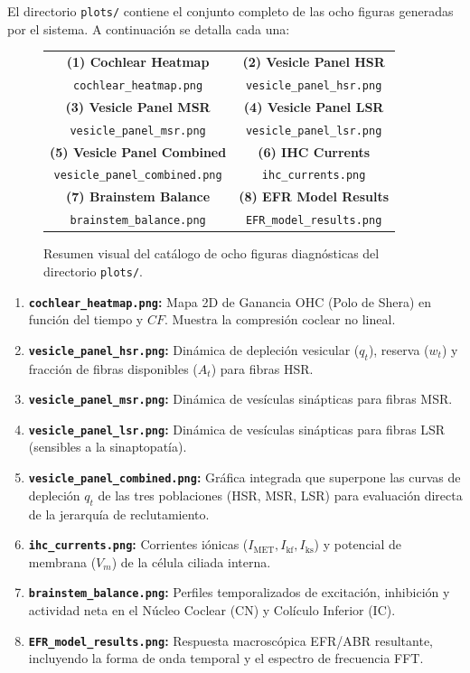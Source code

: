 \documentclass[12pt,a4paper]{article}
\begin{document}
El directorio {\texttt{plots/}} contiene el conjunto completo de las ocho figuras generadas por el sistema. A continuación se detalla cada una:

\begin{figure}[H]
    \centering
    \caption{Resumen visual del catálogo de ocho figuras diagnósticas del directorio \texttt{plots/}.}
    \label{fig:catalogo_plots}
    \begin{tabular}{cc}
        \textbf{(1) Cochlear Heatmap} & \textbf{(2) Vesicle Panel HSR} \\
        \texttt{cochlear\_heatmap.png} & \texttt{vesicle\_panel\_hsr.png} \\[0.5em]
        \textbf{(3) Vesicle Panel MSR} & \textbf{(4) Vesicle Panel LSR} \\
        \texttt{vesicle\_panel\_msr.png} & \texttt{vesicle\_panel\_lsr.png} \\[0.5em]
        \textbf{(5) Vesicle Panel Combined} & \textbf{(6) IHC Currents} \\
        \texttt{vesicle\_panel\_combined.png} & \texttt{ihc\_currents.png} \\[0.5em]
        \textbf{(7) Brainstem Balance} & \textbf{(8) EFR Model Results} \\
        \texttt{brainstem\_balance.png} & \texttt{EFR\_model\_results.png} \\
    \end{tabular}
\end{figure}

\begin{enumerate}
    \item \textbf{\texttt{cochlear\_heatmap.png}:} Mapa 2D de Ganancia OHC (Polo de Shera) en función del tiempo y $CF$. Muestra la compresión coclear no lineal.
    \item \textbf{\texttt{vesicle\_panel\_hsr.png}:} Dinámica de depleción vesicular ($q_t$), reserva ($w_t$) y fracción de fibras disponibles ($A_t$) para fibras HSR.
    \item \textbf{\texttt{vesicle\_panel\_msr.png}:} Dinámica de vesículas sinápticas para fibras MSR.
    \item \textbf{\texttt{vesicle\_panel\_lsr.png}:} Dinámica de vesículas sinápticas para fibras LSR (sensibles a la sinaptopatía).
    \item \textbf{\texttt{vesicle\_panel\_combined.png}:} Gráfica integrada que superpone las curvas de depleción $q_t$ de las tres poblaciones (HSR, MSR, LSR) para evaluación directa de la jerarquía de reclutamiento.
    \item \textbf{\texttt{ihc\_currents.png}:} Corrientes iónicas ($I_{\text{MET}}, I_{\text{kf}}, I_{\text{ks}}$) y potencial de membrana ($V_m$) de la célula ciliada interna.
    \item \textbf{\texttt{brainstem\_balance.png}:} Perfiles temporalizados de excitación, inhibición y actividad neta en el Núcleo Coclear (CN) y Colículo Inferior (IC).
    \item \textbf{\texttt{EFR\_model_results.png}:} Respuesta macroscópica EFR/ABR resultante, incluyendo la forma de onda temporal y el espectro de frecuencia FFT.
\end{enumerate}
\end{document}
